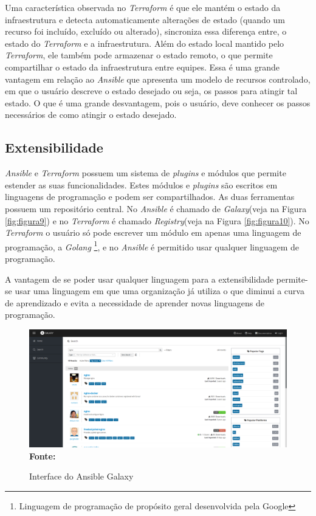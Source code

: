 Uma característica observada no \textit{Terraform} é que ele mantém o estado da infraestrutura e detecta automaticamente alterações de estado (quando um recurso foi incluído, excluído ou alterado), sincroniza essa diferença entre, o estado do \textit{Terraform} e a infraestrutura. Além do estado local mantido pelo \textit{Terraform}, ele também pode armazenar o estado remoto, o que permite   compartilhar o estado da infraestrutura entre equipes. Essa é uma grande vantagem em relação ao \textit{Ansible} que apresenta um modelo de recursos controlado, em que o usuário descreve o estado desejado ou seja, os passos para atingir tal estado. O que é uma grande desvantagem, pois o usuário, deve conhecer os passos necessários de como atingir o estado desejado. 


\subsection{Extensibilidade}

\textit{Ansible} e \textit{Terraform} possuem um sistema de \textit{plugins} e módulos que permite estender as suas funcionalidades. Estes módulos e \textit{plugins} são escritos em linguagens de programação e podem ser compartilhados. As duas ferramentas possuem um repositório central. No \textit{Ansible} é chamado de \textit{Galaxy}(veja na Figura \ref{fig:figura9}) e no \textit{Terraform} é chamado \textit{Registry}(veja na Figura \ref{fig:figura10}). No \textit{Terraform} o usuário só pode escrever um módulo em apenas uma linguagem de programação, a \textit{Golang}  \footnote{Linguagem de programação de propósito geral desenvolvida pela Google}, e no \textit{Ansible} é permitido usar qualquer linguagem de programação.  

A vantagem de se poder usar qualquer linguagem para a extensibilidade permite-se usar uma linguagem em que uma organização já utiliza o que diminui a curva de aprendizado e evita a necessidade de aprender novas linguagens de programação.

\begin{figure}[H]
	\centering	
	\caption[\hspace{0.1cm} Interface do Ansible Galaxy]{Interface do Ansible Galaxy}
	\vspace{-0.4cm}
	\includegraphics[width=1.0\textwidth]{artigo/figuras/galaxy_2.png}
	 \vspace{-0.2cm}
	\\\textbf{\footnotesize Fonte: \cite{ansible_galaxy}}
	\label{fig:figura12}
\end{figure}
\vspace{-0.5cm}

